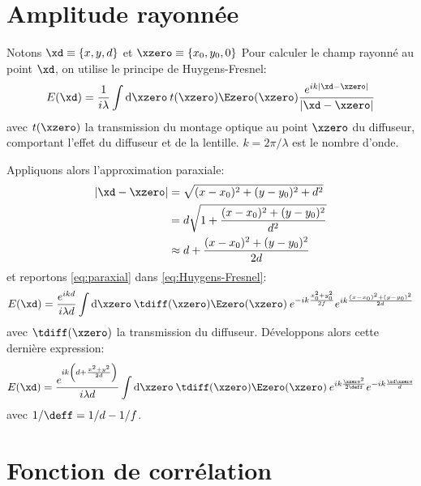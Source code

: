 \section{Amplitude rayonnée}
Notons $\xd \equiv \left\lbrace x,y,d \right\rbrace$ et $\xzero \equiv \left\lbrace x_0,y_0,0 \right\rbrace$
Pour calculer le champ rayonné au point $\xd$, on utilise le principe de Huygens-Fresnel:
\begin{equation}
E(\xd)=\frac{1}{i \lambda} \int {\mathrm{d}\xzero \: t(\xzero) \Ezero(\xzero) \frac{e^{ik \left| \xd-\xzero \right| }}{\left| \xd - \xzero \right| }}
\label{eq:Huygens-Fresnel}
\end{equation}
avec $t(\xzero)$ la transmission du montage optique au point $\xzero$ du diffuseur, comportant l'effet du diffuseur et de la lentille. $k=2\pi /\lambda$ est le nombre d'onde.

Appliquons alors l'approximation paraxiale:
\begin{align}
\nonumber \left| \xd - \xzero \right| &= \sqrt{(x-x_0)^2+(y-y_0)^2+d^2} \\
\nonumber & = d \sqrt{1+\frac{(x-x_0)^2+(y-y_0)^2}{d^2}} \\
& \approx d+ \frac{(x-x_0)^2+(y-y_0)^2}{2d}
\label{eq:paraxial}
\end{align}
et reportons \ref{eq:paraxial} dans \ref{eq:Huygens-Fresnel}:
\begin{equation}
E(\xd)=\frac{e^{ikd}}{i \lambda d} \int{\mathrm{d} \xzero \: \tdiff(\xzero) \Ezero(\xzero) \: e^{-ik \frac{x_0^2+y_0^2}{2f}} e^{ik \frac{(x-x_0)^2+(y-y_0)^2}{2d}}}
\end{equation}
avec $\tdiff(\xzero)$ la transmission du diffuseur. Développons alors cette dernière expression:
\begin{equation}
E(\xd)=\frac{e^{i k \left( d + \frac{x^2 + y^2}{2 d}\right) }}{i \lambda d} \int{\mathrm{d} \xzero \: \tdiff(\xzero) \Ezero(\xzero) \: e^{ik \frac{\xzero^2}{2 \deff}} e^{-ik\frac{\xd \xzero}{d}}}
\end{equation}
avec $1/\deff=1/d-1/f$.



\section{Fonction de corrélation}

